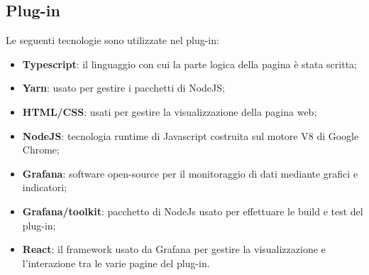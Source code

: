 \documentclass[../manuale-sviluppatore.tex]{subfiles}
\begin{document}
\subsection{Plug-in}%
\label{subsc:plug_in}
Le seguenti tecnologie sono utilizzate nel plug-in:
\begin{itemize}
  \item \textbf{Typescript}: il linguaggio con cui la parte logica della pagina è stata scritta;
  \item \textbf{Yarn}: usato per gestire i pacchetti di NodeJS;
  \item \textbf{HTML/CSS}: usati per gestire la visualizzazione della pagina web;
  \item \textbf{NodeJS}: tecnologia runtime di Javascript costruita sul motore V8 di Google Chrome;
  \item \textbf{Grafana}: software open-source per il monitoraggio di dati mediante grafici e indicatori;
  \item \textbf{Grafana/toolkit}: pacchetto di NodeJs usato per effettuare le build e test del plug-in;
  \item \textbf{React}: il framework usato da Grafana per gestire la visualizzazione e l'interazione tra le varie pagine del plug-in.
\end{itemize}
\end{document}
